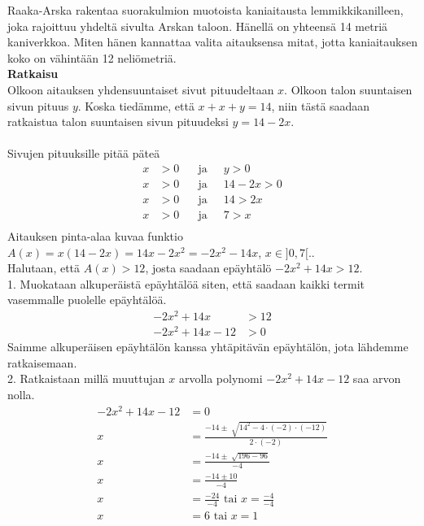 \begin{esimerkki}
Raaka-Arska rakentaa suorakulmion muotoista kaniaitausta lemmikkikanilleen, joka rajoittuu yhdeltä sivulta Arskan taloon. Hänellä on yhteensä 14 metriä kaniverkkoa. Miten hänen kannattaa valita aitauksensa mitat, jotta kaniaitauksen koko on vähintään 12 neliömetriä. \\
\textbf{Ratkaisu}\\
Olkoon aitauksen yhdensuuntaiset sivut pituudeltaan $x$. Olkoon talon suuntaisen sivun pituus $y$. Koska tiedämme, että $x+x+y=14$, niin tästä saadaan ratkaistua talon suuntaisen sivun pituudeksi $y=14 - 2x$. \\ \\
Sivujen pituuksille pitää päteä
\begin{align*}
x&>0 \ \ \ \ \ \ \text{ ja } \ \ \ \ \ y>0 \\
x&>0 \ \ \ \ \ \ \text{ ja } \ \ \ \ \ 14-2x>0 \\ 
x&>0 \ \ \ \ \ \ \text{ ja } \ \ \ \ \ 14>2x \\ 
x&>0 \ \ \ \ \ \ \text{ ja } \ \ \ \ \ 7>x \\
\end{align*} 
Aitauksen pinta-alaa kuvaa funktio $A(x)=x(14-2x)=14x-2x^2=-2x^2-14x$, $x \in ]0,7[.$. \\
Halutaan, että $A(x)>12$, josta saadaan epäyhtälö $-2x^2+14x>12$. \\
1. Muokataan alkuperäistä epäyhtälöä siten, että saadaan kaikki termit vasemmalle puolelle epäyhtälöä.
\begin{align*}
-2x^2+14x&>12 \\
-2x^2+14x-12&>0
\end{align*}
Saimme alkuperäisen epäyhtälön kanssa yhtäpitävän epäyhtälön, jota lähdemme ratkaisemaan. \\
2. Ratkaistaan millä muuttujan $x$ arvolla polynomi $-2x^2+14x-12$ saa arvon nolla.
\begin{align*}
-2x^2+14x-12&=0 \\
x&=\frac{-14 \pm \sqrt[]{14^2-4 \cdot (-2) \cdot (-12)}}{2 \cdot (-2)} \\
x&=\frac{-14 \pm \sqrt[]{196-96}}{-4} \\
x&=\frac{-14 \pm 10}{-4} \\
x&=\frac{-24}{-4} \text{ tai } x=\frac{-4}{-4} \\
x&=6 \text{ tai } x=1
\end{align*}

\begin{lukusuora}{-2.5}{2.5}{5}
\end{lukusuora}


\end{esimerkki}
